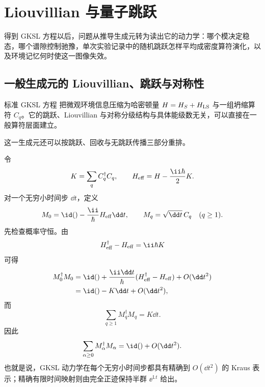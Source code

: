 \section{Liouvillian 与量子跳跃}
\label{chap:liouvillian-trajectories}

得到 GKSL 方程以后，问题从推导生成元转为读出它的动力学：哪个模决定稳态，哪个谱隙控制驰豫，单次实验记录中的随机跳跃怎样平均成密度算符演化，以及环境记忆何时使这一图像失效。

\subsection{一般生成元的 Liouvillian、跳跃与对称性}
\label{sec:phys-oqs-unified}

标准 GKSL 方程 把微观环境信息压缩为哈密顿量 $H=H_S+H_{\rm LS}$ 与一组坍缩算符 $C_q$。它的跳跃、Liouvillian 与对称分级结构与具体能级数无关，可以直接在一般算符层面建立。

这一生成元还可以按跳跃、回收与无跳跃传播三部分重排。

令
\begin{equation}
K=\sum_q C_q^\dagger C_q,
\qquad
H_{\rm eff}=H-\frac{\ii\hbar}{2}K.
\label{eq:phys-oqs-heff-general}
\end{equation}
对一个无穷小时间步 $\dd t$，定义
\begin{equation}
M_0=\id()-\frac{\ii}{\hbar}H_{\rm eff}\dd t,
\qquad
M_q=\sqrt{\dd t}\,C_q\quad(q\ge1).
\label{eq:phys-oqs-infinitesimal-kraus}
\end{equation}
先检查概率守恒。由
\[
H_{\rm eff}^\dagger-H_{\rm eff}=\ii\hbar K
\]
可得
\begin{align}
M_0^\dagger M_0
&=\id()+\frac{\ii\dd t}{\hbar}
(H_{\rm eff}^\dagger-H_{\rm eff})+O(\dd t^2)\nonumber\\
&=\id()-K\dd t+O(\dd t^2),
\end{align}
而
\[
\sum_{q\ge1}M_q^\dagger M_q
=K\dd t.
\]
因此
\begin{equation}
\sum_{\alpha\ge0}M_\alpha^\dagger M_\alpha
=\id()+O(\dd t^2).
\label{eq:phys-oqs-infinitesimal-completeness}
\end{equation}
也就是说，GKSL 动力学在每个无穷小时间步都具有精确到 $O(\dd t^2)$ 的 Kraus 表示；精确有限时间映射则由完全正迹保持半群 $\ee^{\mathbb L t}$ 给出。

